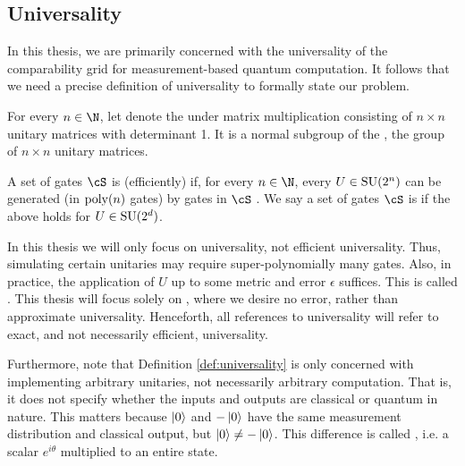 \subsection{Universality}

In this thesis, we are primarily concerned with the universality of the comparability grid for measurement-based quantum computation. It follows that we need a precise definition of universality to formally state our problem.

\begin{definition}
For every $n \in \N$, let  denote the  under matrix multiplication consisting of $n \times n$ unitary matrices with determinant 1. It is a normal subgroup of the  , the group of $n \times n$ unitary matrices.
\end{definition}

\begin{definition}
\label{def:universality}
A set of gates $\cS$ is (efficiently)  if, for every $n \in \N$, every $U \in \operatorname{SU}(2^n)$ can be generated (in $\operatorname{poly}(n)$ gates) by gates in $\cS$ \cite{MBQC-universal}. We say a set of gates $\cS$ is  if the above holds for $U \in \operatorname{SU}(2^d)$.
\end{definition}

In this thesis we will only focus on universality, not efficient universality. Thus, simulating certain unitaries may require super-polynomially many gates. Also, in practice, the application of $U$ up to some metric and error $\epsilon$ suffices. This is called . This thesis will focus solely on , where we desire no error, rather than approximate universality. Henceforth, all references to universality will refer to exact, and not necessarily efficient, universality.

Furthermore, note that Definition \ref{def:universality} is only concerned with implementing arbitrary unitaries, not necessarily arbitrary computation. That is, it does not specify whether the inputs and outputs are classical or quantum in nature. This matters because $\ket0$ and $-\ket0$ have the same measurement distribution and classical output, but $\ket0 \neq -\ket0$. This difference is called , i.e. a scalar $e^{i\theta}$ multiplied to an entire state.

